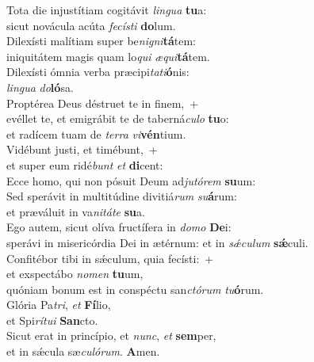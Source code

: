 \evenverse Tota die injustítiam cogitávit \textit{lin}\textit{gua} \textbf{tu}a:~\*\\
\evenverse sicut novácula acúta \textit{fe}\textit{cí}\textit{sti} \textbf{do}lum.\\
\oddverse Dilexísti malítiam super be\textit{ni}\textit{gni}\textbf{tá}tem:~\*\\
\oddverse iniquitátem magis quam lo\textit{qui} \textit{æ}\textit{qui}\textbf{tá}tem.\\
\evenverse Dilexísti ómnia verba præcipi\textit{ta}\textit{ti}\textbf{ó}nis:~\*\\
\evenverse \textit{lin}\textit{gua} \textit{do}\textbf{ló}sa.\\
\oddverse Proptérea Deus déstruet te in finem,~+\\
\oddverse  evéllet te, et emigrábit te de taberná\textit{cu}\textit{lo} \textbf{tu}o:~\*\\
\oddverse et radícem tuam de \textit{ter}\textit{ra} \textit{vi}\textbf{vén}tium.\\
\evenverse Vidébunt justi, et timébunt,~+\\
\evenverse  et super eum ridé\textit{bunt} \textit{et} \textbf{di}cent:~\*\\
\evenverse Ecce homo, qui non pósuit Deum ad\textit{ju}\textit{tó}\textit{rem} \textbf{su}um:\\
\oddverse Sed sperávit in multitúdine divitiá\textit{rum} \textit{su}\textbf{á}rum:~\*\\
\oddverse et præváluit in va\textit{ni}\textit{tá}\textit{te} \textbf{su}a.\\
\evenverse Ego autem, sicut olíva fructífera in \textit{do}\textit{mo} \textbf{De}i:~\*\\
\evenverse sperávi in misericórdia Dei in ætérnum: et in \textit{sǽ}\textit{cu}\textit{lum} \textbf{sǽ}culi.\\
\oddverse Confitébor tibi in sǽculum, quia fecísti:~+\\
\oddverse  et exspectábo \textit{no}\textit{men} \textbf{tu}um,~\*\\
\oddverse quóniam bonum est in conspéctu san\textit{ctó}\textit{rum} \textit{tu}\textbf{ó}rum.\\
\evenverse Glória Pa\textit{tri}, \textit{et} \textbf{Fí}lio,~\*\\
\evenverse et Spi\textit{rí}\textit{tu}\textit{i} \textbf{San}cto.\\
\oddverse Sicut erat in princípio, et \textit{nunc}, \textit{et} \textbf{sem}per,~\*\\
\oddverse et in sǽcula sæ\textit{cu}\textit{ló}\textit{rum}. \textbf{A}men.\\
